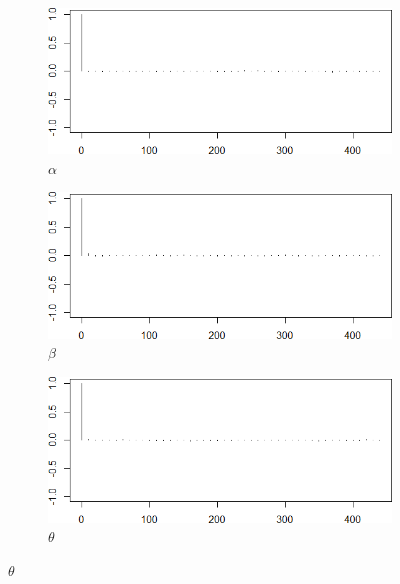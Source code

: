 \documentclass{Class/julia}
\begin{document}
\begin{figure}[!ht]
    \centering
    \caption{Autocorrelation Plots After Thinning}
    \label{fig:8}
    \begin{subfigure}{0.45\textwidth}
        \centering
        \includegraphics[width=\textwidth]{rytgaard1990/acf_after_thinning_alpha.png}
        \caption{\( \alpha \)}
    \end{subfigure}
    \hfill
    \begin{subfigure}{0.45\textwidth}
        \centering
        \includegraphics[width=\textwidth]{rytgaard1990/acf_after_thinning_beta.png}
        \caption{\( \beta \)}
    \end{subfigure}

    \vspace{1em}

    \begin{subfigure}{0.45\textwidth}
        \centering
        \includegraphics[width=\textwidth]{rytgaard1990/acf_after_thinning_theta.png}
        \caption{\( \theta \)}
    \end{subfigure}

\end{figure}
\end{document}
